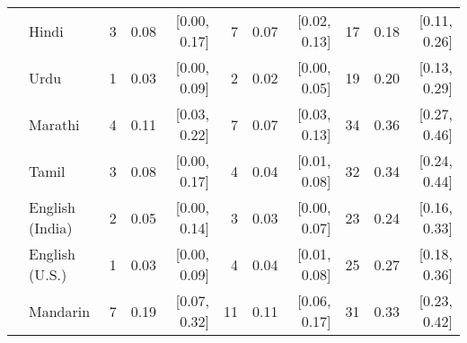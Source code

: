 \begin{table}[t]
\begin{footnotesize}
\begin{tabular}{p{.1in}lrrrrrrrrr}
 & Hindi & 3 & 0.08 & [0.00, 0.17] & 7 & 0.07 & [0.02, 0.13] & 17 & 0.18 & [0.11, 0.26]\\

 & Urdu & 1 & 0.03 & [0.00, 0.09] & 2 & 0.02 & [0.00, 0.05] & 19 & 0.20 & [0.13, 0.29]\\

 & Marathi & 4 & 0.11 & [0.03, 0.22] & 7 & 0.07 & [0.03, 0.13] & 34 & 0.36 & [0.27, 0.46]\\

 & Tamil & 3 & 0.08 & [0.00, 0.17] & 4 & 0.04 & [0.01, 0.08] & 32 & 0.34 & [0.24, 0.44]\\

 & English (India) & 2 & 0.05 & [0.00, 0.14] & 3 & 0.03 & [0.00, 0.07] & 23 & 0.24 & [0.16, 0.33]\\

 & English (U.S.) & 1 & 0.03 & [0.00, 0.09] & 4 & 0.04 & [0.01, 0.08] & 25 & 0.27 & [0.18, 0.36]\\

& Mandarin & 7 & 0.19 & [0.07, 0.32] & 11 & 0.11 & [0.06, 0.17] & 31 & 0.33 & [0.23, 0.42]\\
\bottomrule
\end{tabular}
\end{footnotesize}
\end{table}